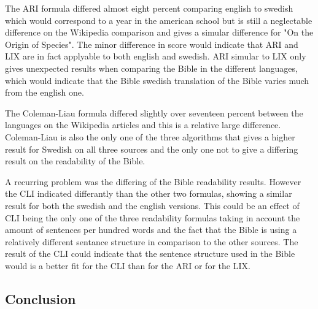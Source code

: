 \documentclass[a4paper]{article}
\begin{document}
The ARI formula differed almost eight percent comparing english to swedish which would correspond to a year in the american school but is still a neglectable difference on the Wikipedia comparison and gives a simular difference for "On the Origin of Species". The minor difference in score would indicate that ARI and LIX are in fact applyable to both english and swedish. ARI simular to LIX only gives unexpected results when comparing the Bible in the different languages, which would indicate that the Bible swedish translation of the Bible varies much from the english one.

The Coleman-Liau formula differed slightly over seventeen percent between the languages on the Wikipedia articles and this is a relative large difference. Coleman-Liau is also the only one of the three algorithms that gives a higher result for Swedish on all three sources and the only one not to give a differing result on the readability of the Bible.

A recurring problem was the differing of the Bible readability results. However the CLI indicated differantly than the other two formulas, showing a similar result for both the swedish and the english versions. This could be an effect of CLI being the only one of the three readability formulas taking in account the amount of sentences per hundred words and the fact that the Bible is using a relatively different sentance structure in comparison to the other sources. The result of the CLI could indicate that the sentence structure used in the Bible would is a better fit for the CLI than for the ARI or for the LIX.

\subsection{Conclusion}
\end{document}
